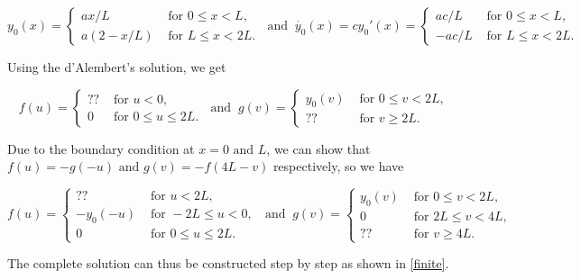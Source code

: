 \documentclass[a4paper,12pt]{report}
\begin{document}
\begin{equation}
	y_0 (x) = \begin{cases}
		ax /L &\text{ for } 0 \le x < L,\\
		a(2-x /L) &\text{ for } L \le x <2L.
	\end{cases} ~\text { and }~ \dot{y_0 }(x) = cy_0'(x) = \begin{cases}
		ac /L &\text{ for } 0 \le x<L,\\
		-ac /L &\text{ for } L \le x <2L.
	\end{cases} 
\end{equation}

Using the d'Alembert's solution, we get 

\begin{equation}
	f(u) = \begin{cases}
		?? &\text{ for } u < 0,\\
		0 &\text{ for } 0 \le u \le 2L.
	\end{cases} ~\text { and }~ g(v) = \begin{cases}
		y_0 (v) &\text{ for } 0 \le  v < 2L,\\
		??  &\text{ for } v \ge 2L.
	\end{cases}
\end{equation}

Due to the boundary condition at \(x=0 \text { and } L\), we can show that \(f(u) = -g(-u) \text { and } g(v) = -f(4L-v)\) respectively, so we have

\begin{equation}
	f(u) = \begin{cases}
		?? &\text{ for } u < 2L,\\
		-y_0 (-u) &\text{ for } -2L \le u <0,\\
		0 &\text{ for } 0 \le u \le 2L.
	\end{cases} ~\text { and }~ g(v) = \begin{cases}
		y_0 (v) &\text{ for } 0 \le  v < 2L,\\
		0 &\text{ for } 2L \le v <4L,\\ 
		??  &\text{ for } v \ge 4L.
	\end{cases}
\end{equation}

The complete solution can thus be constructed step by step as shown in \cref{finite}.

\end{document}
